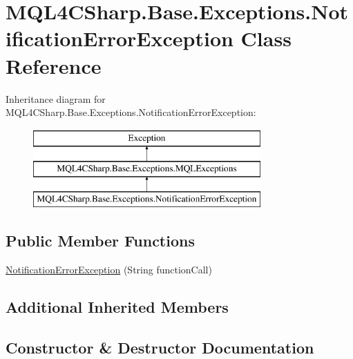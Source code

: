 \hypertarget{class_m_q_l4_c_sharp_1_1_base_1_1_exceptions_1_1_notification_error_exception}{}\section{M\+Q\+L4\+C\+Sharp.\+Base.\+Exceptions.\+Notification\+Error\+Exception Class Reference}
\label{class_m_q_l4_c_sharp_1_1_base_1_1_exceptions_1_1_notification_error_exception}
Inheritance diagram for M\+Q\+L4\+C\+Sharp.\+Base.\+Exceptions.\+Notification\+Error\+Exception\+:\begin{figure}[H]
\begin{center}
\leavevmode
\includegraphics[height=3.000000cm]{class_m_q_l4_c_sharp_1_1_base_1_1_exceptions_1_1_notification_error_exception}
\end{center}
\end{figure}
\subsection*{Public Member Functions}
\begin{DoxyCompactItemize}
\item 
\hyperlink{class_m_q_l4_c_sharp_1_1_base_1_1_exceptions_1_1_notification_error_exception_a5f8a64ca770935d9aa55151f700838d1}{Notification\+Error\+Exception} (String function\+Call)
\end{DoxyCompactItemize}
\subsection*{Additional Inherited Members}


\subsection{Constructor \& Destructor Documentation}

